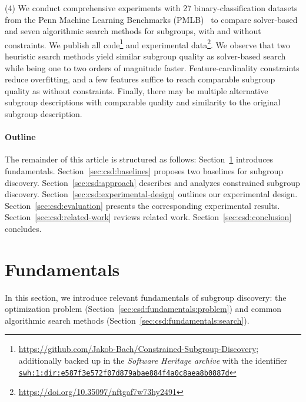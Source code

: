 \documentclass[acmsmall]{acmart} %
\theoremstyle{acmplain}
\theoremstyle{acmdefinition}
\begin{document}
(4) We conduct comprehensive experiments with 27 binary-classification datasets from the Penn Machine Learning Benchmarks (PMLB)~\cite{olson2017pmlb, romano2021pmlb} to compare solver-based and seven algorithmic search methods for subgroups, with and without constraints.
We publish all code\footnote{\url{https://github.com/Jakob-Bach/Constrained-Subgroup-Discovery}; additionally backed up in the \emph{Software Heritage archive} with the identifier \href{https://archive.softwareheritage.org/swh:1:dir:e587f3e572f07d879abae884f4a0c8aea8b0887d;origin=https://github.com/Jakob-Bach/Constrained-Subgroup-Discovery;visit=swh:1:snp:e2a212e43df12460d56ea557ee8f9470d3c3dcfb;anchor=swh:1:rev:8e8e1f5e54ac7644fc34f57cae2ad39b6fc1d453}{\texttt{swh:1:dir:e587f3e572f07d879abae884f4a0c8aea8b0887d}}} and experimental data\footnote{\url{https://doi.org/10.35097/nftgaf7w73hy2491}}.
We observe that two heuristic search methods yield similar subgroup quality as solver-based search while being one to two orders of magnitude faster.
Feature-cardinality constraints reduce overfitting, and a few features suffice to reach comparable subgroup quality as without constraints.
Finally, there may be multiple alternative subgroup descriptions with comparable quality and similarity to the original subgroup description.

\paragraph{Outline}

The remainder of this article is structured as follows:
Section~\ref{sec:csd:fundamentals} introduces fundamentals.
Section~\ref{sec:csd:baselines} proposes two baselines for subgroup discovery.
Section~\ref{sec:csd:approach} describes and analyzes constrained subgroup discovery.
Section~\ref{sec:csd:experimental-design} outlines our experimental design.
Section~\ref{sec:csd:evaluation} presents the corresponding experimental results.
Section~\ref{sec:csd:related-work} reviews related work.
Section~\ref{sec:csd:conclusion} concludes.

\section{Fundamentals}
\label{sec:csd:fundamentals}

In this section, we introduce relevant fundamentals of subgroup discovery:
the optimization problem (Section~\ref{sec:csd:fundamentals:problem}) and common algorithmic search methods (Section~\ref{sec:csd:fundamentals:search}).
\end{document}
